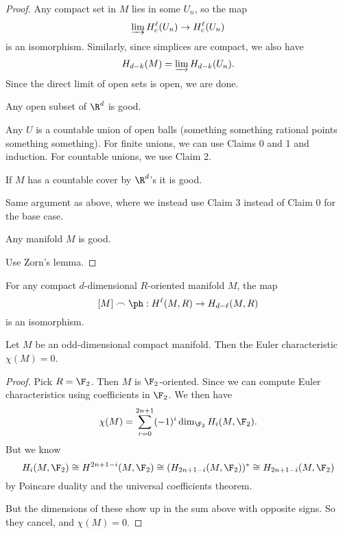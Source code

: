 \documentclass[a4paper]{article}
\begin{document}
\begin{proof}
  Any compact set in $M$ lies in some $U_n$, so the map
  \[
    \varinjlim H_c^\ell (U_n) \to H_c^\ell(U_n)
  \]
  is an isomorphism. Similarly, since simplices are compact, we also have
  \[
    H_{d - k}(M) = \varinjlim H_{d - k}(U_n).
  \]
  Since the direct limit of open sets is open, we are done.

  \begin{claim}[Claim 3]
    Any open subset of $\R^d$ is good.
  \end{claim}
  Any $U$ is a countable union of open balls (something something rational points something something). For finite unions, we can use Claims 0 and 1 and induction. For countable unions, we use Claim 2.

  \begin{claim}
    If $M$ has a countable cover by $\R^d$'s it is good.
  \end{claim}
  Same argument as above, where we instead use Claim 3 instead of Claim 0 for the base case.

  \begin{claim}
    Any manifold $M$ is good.
  \end{claim}
  Use Zorn's lemma.
\end{proof}

\begin{cor}
  For any compact $d$-dimensional $R$-oriented manifold $M$, the map
  \[
    [M] \frown \ph: H^\ell(M, R) \to H_{d - \ell}(M, R)
  \]
  is an isomorphism.
\end{cor}

\begin{cor}
  Let $M$ be an odd-dimensional compact manifold. Then the Euler characteristic $\chi(M) = 0$.
\end{cor}

\begin{proof}
  Pick $R = \F_2$. Then $M$ is $\F_2$-oriented. Since we can compute Euler characteristics using coefficients in $\F_2$. We then have
  \[
    \chi(M) = \sum_{r = 0}^{2n + 1} (-1)^i \dim_{\F_2} H_i(M, \F_2).
  \]
  But we know
  \[
    H_i(M, \F_2) \cong H^{2n + 1 - i}(M, \F_2) \cong (H_{2n + 1 - i}(M, \F_2))^* \cong H_{2n + 1 - i}(M, \F_2)
  \]
  by Poincare duality and the universal coefficients theorem.

  But the dimensions of these show up in the sum above with opposite signs. So they cancel, and $\chi(M) = 0$.
\end{proof}
\end{document}
